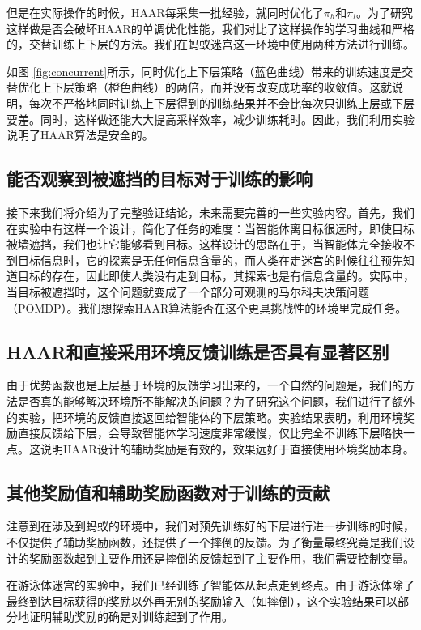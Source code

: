 但是在实际操作的时候，HAAR每采集一批经验，就同时优化了$\pi_h$和$\pi_l$。为了研究这样做是否会破坏HAAR的单调优化性能，我们对比了这样操作的学习曲线和严格的，交替训练上下层的方法。我们在蚂蚁迷宫这一环境中使用两种方法进行训练。

如图 \ref{fig:concurrent}所示，同时优化上下层策略（蓝色曲线）带来的训练速度是交替优化上下层策略（橙色曲线）的两倍，而并没有改变成功率的收敛值。这就说明，每次不严格地同时训练上下层得到的训练结果并不会比每次只训练上层或下层要差。同时，这样做还能大大提高采样效率，减少训练耗时。因此，我们利用实验说明了HAAR算法是安全的。

\subsection{能否观察到被遮挡的目标对于训练的影响}
接下来我们将介绍为了完整验证结论，未来需要完善的一些实验内容。首先，我们在实验中有这样一个设计，简化了任务的难度：当智能体离目标很远时，即使目标被墙遮挡，我们也让它能够看到目标。这样设计的思路在于，当智能体完全接收不到目标信息时，它的探索是无任何信息含量的，而人类在走迷宫的时候往往预先知道目标的存在，因此即使人类没有走到目标，其探索也是有信息含量的。实际中，当目标被遮挡时，这个问题就变成了一个部分可观测的马尔科夫决策问题（POMDP）。我们想探索HAAR算法能否在这个更具挑战性的环境里完成任务。

\subsection{HAAR和直接采用环境反馈训练是否具有显著区别}
由于优势函数也是上层基于环境的反馈学习出来的，一个自然的问题是，我们的方法是否真的能够解决环境所不能解决的问题？为了研究这个问题，我们进行了额外的实验，把环境的反馈直接返回给智能体的下层策略。实验结果表明，利用环境奖励直接反馈给下层，会导致智能体学习速度非常缓慢，仅比完全不训练下层略快一点。这说明HAAR设计的辅助奖励是有效的，效果远好于直接使用环境奖励本身。

\subsection{其他奖励值和辅助奖励函数对于训练的贡献}
注意到在涉及到蚂蚁的环境中，我们对预先训练好的下层进行进一步训练的时候，不仅提供了辅助奖励函数，还提供了一个摔倒的反馈。为了衡量最终究竟是我们设计的奖励函数起到主要作用还是摔倒的反馈起到了主要作用，我们需要控制变量。

在游泳体迷宫的实验中，我们已经训练了智能体从起点走到终点。由于游泳体除了最终到达目标获得的奖励以外再无别的奖励输入（如摔倒），这个实验结果可以部分地证明辅助奖励的确是对训练起到了作用。

